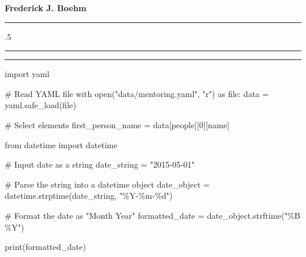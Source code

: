 \documentclass[
]
{article}
\newenvironment{Shaded}{\begin{snugshade}}{\end{snugshade}}
\newcommand{\BuiltInTok}[1]{\textcolor[rgb]{0.00,0.23,0.31}{#1}}
\newcommand{\CommentTok}[1]{\textcolor[rgb]{0.37,0.37,0.37}{#1}}
\newcommand{\ControlFlowTok}[1]{\textcolor[rgb]{0.00,0.23,0.31}{#1}}
\newcommand{\DecValTok}[1]{\textcolor[rgb]{0.68,0.00,0.00}{#1}}
\newcommand{\ImportTok}[1]{\textcolor[rgb]{0.00,0.46,0.62}{#1}}
\newcommand{\NormalTok}[1]{\textcolor[rgb]{0.00,0.23,0.31}{#1}}
\newcommand{\OperatorTok}[1]{\textcolor[rgb]{0.37,0.37,0.37}{#1}}
\newcommand{\SpecialCharTok}[1]{\textcolor[rgb]{0.37,0.37,0.37}{#1}}
\newcommand{\StringTok}[1]{\textcolor[rgb]{0.13,0.47,0.30}{#1}}
\begin{document}
\centerline{\huge \bf Frederick J. Boehm}

\vspace{2 mm}

\hrule

\vspace{2 mm}



\moveleft.5\hoffset\centerline{         }



\vspace{2 mm}

\hrule



\hrule

\begin{Shaded}
\begin{Highlighting}[]
\ImportTok{import}\NormalTok{ yaml}

\CommentTok{\# Read YAML file}
\ControlFlowTok{with} \BuiltInTok{open}\NormalTok{(}\StringTok{"data/mentoring.yaml"}\NormalTok{, }\StringTok{"r"}\NormalTok{) }\ImportTok{as} \BuiltInTok{file}\NormalTok{:}
\NormalTok{    data }\OperatorTok{=}\NormalTok{ yaml.safe\_load(}\BuiltInTok{file}\NormalTok{)}

\CommentTok{\# Select elements}
\NormalTok{first\_person\_name }\OperatorTok{=}\NormalTok{ data[}\StringTok{\textquotesingle{}people\textquotesingle{}}\NormalTok{][}\DecValTok{0}\NormalTok{][}\StringTok{\textquotesingle{}name\textquotesingle{}}\NormalTok{]}
\end{Highlighting}
\end{Shaded}

\begin{Shaded}
\begin{Highlighting}[]
\ImportTok{from}\NormalTok{ datetime }\ImportTok{import}\NormalTok{ datetime}

\CommentTok{\# Input date as a string}
\NormalTok{date\_string }\OperatorTok{=} \StringTok{"2015{-}05{-}01"}

\CommentTok{\# Parse the string into a datetime object}
\NormalTok{date\_object }\OperatorTok{=}\NormalTok{ datetime.strptime(date\_string, }\StringTok{"\%Y{-}\%m{-}}\SpecialCharTok{\%d}\StringTok{"}\NormalTok{)}

\CommentTok{\# Format the date as "Month Year"}
\NormalTok{formatted\_date }\OperatorTok{=}\NormalTok{ date\_object.strftime(}\StringTok{"\%B \%Y"}\NormalTok{)}

\BuiltInTok{print}\NormalTok{(formatted\_date)}
\end{Highlighting}
\end{Shaded}
\end{document}
